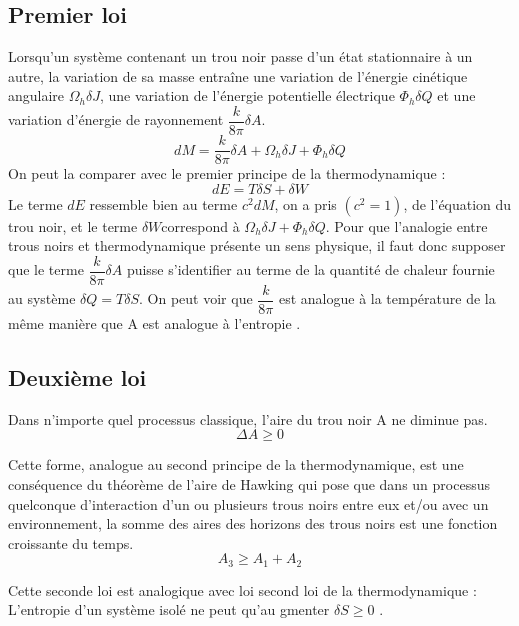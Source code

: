 \documentclass[12pt,  a4paper, openright]{report} %
\begin{document}
\subsection{Premier loi}
Lorsqu'un système contenant un trou noir passe d'un état stationnaire à un autre,  la
variation de sa masse entraîne une variation de l'énergie cinétique angulaire $\Omega_{h}\delta J$, une variation de l'énergie potentielle électrique $\Phi_{h}\delta Q$ et une variation d'énergie de rayonnement $\dfrac{k}{8\pi}\delta A$.
\begin{equation}
\label{ff}
dM=\dfrac{k}{8\pi}\delta A+\Omega_{h}\delta J+\Phi_{h}\delta Q
\end{equation}
On peut la comparer avec le premier principe de la thermodynamique :
\begin{equation}
dE = T\delta S +\delta W
\end{equation}
Le terme $dE$ ressemble bien au terme $c^{2}dM$, on a pris $(c^{2} = 1)$, de l'équation du trou
noir, et le terme $\delta W $correspond à $\Omega_{h}\delta J+\Phi_{h}\delta Q$. Pour que l'analogie entre trous noirs et thermodynamique présente un sens physique, il faut donc supposer que le terme $\dfrac{k}{8\pi}\delta A$ puisse s'identifier au terme de la quantité de chaleur fournie au système $\delta Q = T \delta S$. On peut voir que $\dfrac{k}{8\pi}$ est analogue à la température de la même manière que A est analogue à l'entropie \cite{11}.
\subsection{Deuxième loi}
Dans n'importe quel processus classique, l'aire du trou noir A ne diminue pas.
\begin{equation}
\Delta  A \geq  0
\end{equation}

Cette forme, analogue au second principe de la thermodynamique, est une conséquence
du théorème de l'aire de Hawking qui pose que dans  un processus quelconque d'interaction d'un ou plusieurs trous noirs entre eux et/ou avec un environnement, la somme des aires des horizons des trous noirs est une fonction croissante du temps.
\begin{equation}
A_{3} \geq A_{1} + A_{2}
\end{equation}

Cette seconde loi est analogique avec loi second loi de la thermodynamique :\\
L'entropie d'un système isolé ne peut qu'au gmenter $\delta S \geq 0$ \cite{12}.
\end{document}

